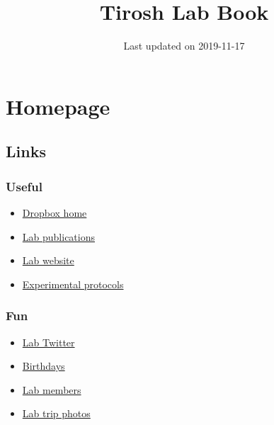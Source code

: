 \documentclass[]{book}
\title{Tirosh Lab Book}
\author{}
\date{Last updated on 2019-11-17}
\providecommand{\tightlist}{%
  \setlength{\itemsep}{0pt}\setlength{\parskip}{0pt}}
\begin{document}
\maketitle

{
\setcounter{tocdepth}{1}
\tableofcontents
}
\chapter{Homepage}\label{homepage}

\section{Links}\label{links}

\subsection{Useful}\label{useful}

\begin{itemize}
\tightlist
\item
  \href{https://www.dropbox.com/home/Tirosh\%20Lab}{Dropbox home}\\
\item
  \href{http://www.weizmann.ac.il/mcb/tirosh/publications-0}{Lab
  publications}\\
\item
  \href{http://www.weizmann.ac.il/mcb/tirosh/}{Lab website}\\
\item
  \href{https://www.dropbox.com/sh/javjoi26i5k5f6t/AADAX4RgSZUFuBwtS6TRE3wua?dl=0}{Experimental
  protocols}
\end{itemize}

\subsection{Fun}\label{fun}

\begin{itemize}
\tightlist
\item
  \href{https://twitter.com/tiroshlab}{Lab Twitter}\\
\item
  \href{https://www.dropbox.com/s/zwss5fg9rkoz7pp/lab\%20bday\%20list.xlsx?dl=0}{Birthdays}\\
\item
  \href{http://www.weizmann.ac.il/mcb/tirosh/group-members}{Lab
  members}\\
\item
  \href{http://www.weizmann.ac.il/mcb/tirosh/pictures}{Lab trip photos}
\end{itemize}
\end{document}
